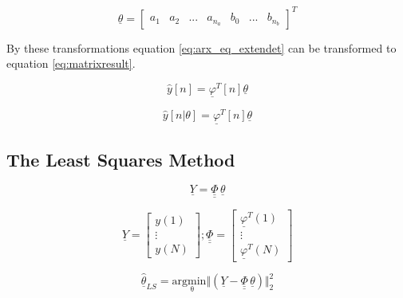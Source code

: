  \begin{equation}
	\underline{\theta} =  \begin{bmatrix}
		a_1 & a_2 & ... & a_{n_a} & b_0 & ... & b_{n_b}
				\end{bmatrix}^T
	\label{eq:thetavec}
\end{equation}

By these transformations equation \ref{eq:arx_eq_extendet} can be transformed to equation \ref{eq:matrixresult}.


 \begin{equation}
			\hat{y}[n] = \underline{\varphi}^T[n] \underline{\theta}		
	\label{eq:matrixresult}
\end{equation}



 \begin{equation}
			\hat{y}[n|\theta] = \underline{\varphi}^T[n] \underline{\theta}		
	\label{eq:matrixresult_2}
\end{equation}



\subsection{The Least Squares Method}
\label{sec:lestsquaremethod}



 \begin{equation}
			\underline{Y} = \underline{\underline{\Phi}} \, \underline{\theta}		
	\label{eq:LS_basic}
\end{equation}

 \begin{equation}
			\underline{Y} =  \begin{bmatrix}
		y(1)\\
		\vdots \\
		y(N)
				\end{bmatrix}	; 
							\underline{\underline{\Phi}} =  \begin{bmatrix}
		\underline{\varphi}^T(1)\\
		\vdots \\
		\underline{\varphi}^T(N)
				\end{bmatrix}	
	\label{eq:Y_Phi_matrice}
\end{equation}



 \begin{equation}
			\hat{\underline{\theta}}_{LS} = \mathrm{arg \underset{\theta} min} \Vert (\underline{Y}-\underline{\underline{\Phi}} \, \underline{\theta}) \Vert^2_2 	
	\label{eq:LS_intro}
\end{equation}


